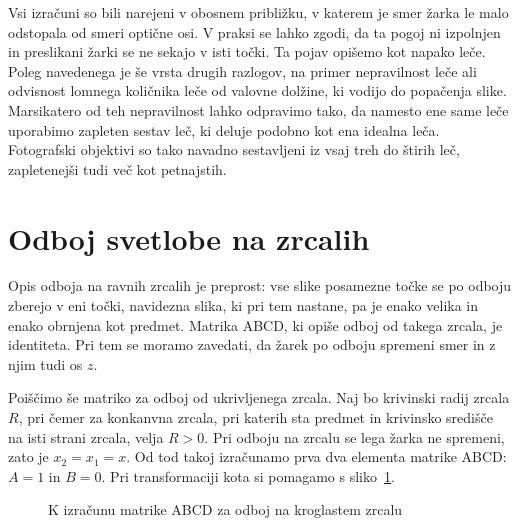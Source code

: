\begin{remark}
Vsi izračuni so bili narejeni v obosnem 
približku, v katerem je smer žarka le malo odstopala od smeri optične osi. V praksi se lahko 
zgodi, da ta pogoj ni izpolnjen in preslikani žarki se ne sekajo v isti točki. Ta pojav opišemo
kot napako leče. Poleg navedenega je še vrsta drugih razlogov, na primer nepravilnost leče 
ali odvisnost lomnega količnika leče od valovne dolžine, ki vodijo do popačenja slike. 
Marsikatero od teh nepravilnost lahko odpravimo tako, da namesto ene same leče uporabimo 
zapleten sestav leč, ki deluje podobno kot ena idealna leča. Fotografski objektivi so 
tako navadno sestavljeni iz vsaj treh do štirih leč, zapletenejši tudi več kot petnajstih.
\end{remark}
 
\section{Odboj svetlobe na zrcalih}
Opis odboja na ravnih zrcalih je 
preprost: vse slike posamezne točke se po odboju zberejo v eni točki, 
navidezna slika, ki pri tem nastane, pa je enako velika in enako obrnjena kot predmet.
Matrika ABCD, ki opiše odboj od takega zrcala, je identiteta. Pri tem se moramo
zavedati, da žarek po odboju spremeni smer in z njim tudi os $z$.

Poiščimo še matriko za odboj od ukrivljenega zrcala. Naj bo krivinski radij zrcala
$R$, pri čemer za konkanvna zrcala, pri katerih sta predmet in krivinsko središče
na isti strani zrcala, velja $R>0$. Pri odboju na zrcalu se lega žarka ne spremeni, zato 
je $x_2 = x_1 = x$. Od tod takoj izračunamo prva dva elementa matrike ABCD: $A = 1$ in 
$B=0$. Pri transformaciji kota si pomagamo s sliko~\ref{fig:02_zrcalo}. 
\begin{figure}[!h]
\centering
\def\svgwidth{80truemm} 

\caption{K izračunu matrike ABCD za odboj na kroglastem zrcalu}
\label{fig:02_zrcalo}
\end{figure}

